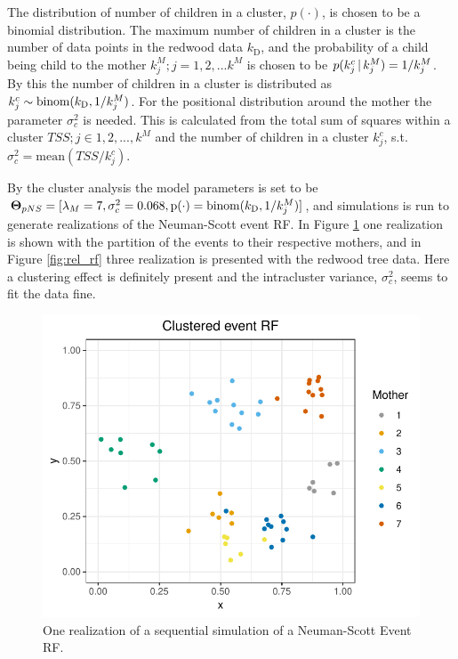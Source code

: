 The distribution of number of children in a cluster, $p(\cdot)$, is chosen to be a binomial distribution. The maximum number of children in a cluster is the number of data points in the redwood data $k_\textrm{D}$, and the probability of a child being child to the mother $k_j^M;j=1,2,...k^M$ is chosen to be $p(k_j^c \, | \, k_j^M) = 1/k_j^M$. By this the number of children in a cluster is distributed as $k_j^c \sim \mathrm{binom}(k_\textrm{D},1/k_j^M)$. For the positional distribution around the mother the parameter $\sigma_c^2$ is needed. This is calculated from the total sum of squares within a cluster $TSS; j\in 1,2,...,k^M$ and the number of children in a cluster $k_j^c$, s.t. $\sigma_c^2 = \mathrm{mean}(TSS/k_j^c)$.

By the cluster analysis the model parameters is set to be $\bm{\Theta}_{pNS} = [\lambda_M = 7, \sigma_c^2 = 0.068, \mathrm{p}(\cdot) = \mathrm{binom}(k_\textrm{D},1/k_j^M)]$, and simulations is run to generate realizations of the Neuman-Scott event RF. In Figure \ref{fig:cluster_event_rf} one realization is shown with the partition of the events to their respective mothers, and in Figure \ref{fig:rel_rf} three realization is presented with the redwood tree data. Here a clustering effect is definitely present and the intracluster variance, $\sigma_c^2$, seems to fit the data fine. 

\begin{figure}
    \centering
    \includegraphics[scale=0.9]{figures/cluster_event_rf.pdf}
    \caption{One realization of a sequential simulation of a Neuman-Scott Event RF.}
    \label{fig:cluster_event_rf}
\end{figure}

